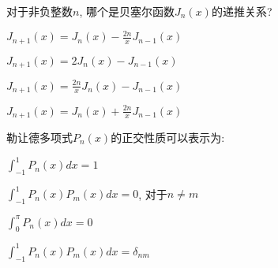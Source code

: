 \documentclass{njustexam}
\begin{document}








\begin{problem}
  对于非负整数$n$, 哪个是贝塞尔函数$J_n(x)$的递推关系?
  \begin{abcd}
    \item  $J_{n+1}(x) = J_n(x) - \frac{2n}{x} J_{n-1}(x)$
    \item  $J_{n+1}(x) = 2 J_n(x) - J_{n-1}(x)$
    \item  $J_{n+1}(x) = \frac{2n}{x} J_n(x) - J_{n-1}(x)$
    \item  $J_{n+1}(x) = J_n(x) + \frac{2n}{x} J_{n-1}(x)$
  \end{abcd}
\end{problem}

\begin{problem}
  勒让德多项式$P_n(x)$的正交性质可以表示为:
  \begin{abcd}
    \item $\int_{-1}^{1} P_n(x) dx = 1$

    \item $\int_{-1}^{1} P_n(x) P_m(x) dx = 0$, 对于$n \neq m$
    
    \item $\int_{0}^{\pi} P_n(x) dx = 0$
    
    \item $\int_{-1}^{1} P_n(x) P_m(x) dx = \delta_{nm}$
  \end{abcd}
\end{problem}
\end{document}
